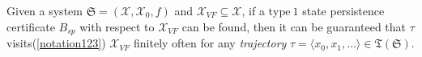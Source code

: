 \documentclass[acmlarge]{acmart}
\begin{document}



\begin{theorem}[persistence]
  Given a system $\mathfrak{S}=(\mathcal{X}, \mathcal{X}_0, f)$ and $\mathcal{X}_{VF} \subseteq \mathcal{X}$, if a $\mathrm{type~1}$ state persistence certificate $B_{sp}$ with respect to $\mathcal{X}_{VF}$ can be found, then it can be guaranteed that $\tau$ visits(\ref{notation123}) \(\mathcal{X}_{VF}\) finitely often for any \emph{trajectory} $\tau = \langle x_0, x_1, \dots \rangle \in \mathfrak{T}(\mathfrak{S})$.
\end{theorem}
\end{document}
